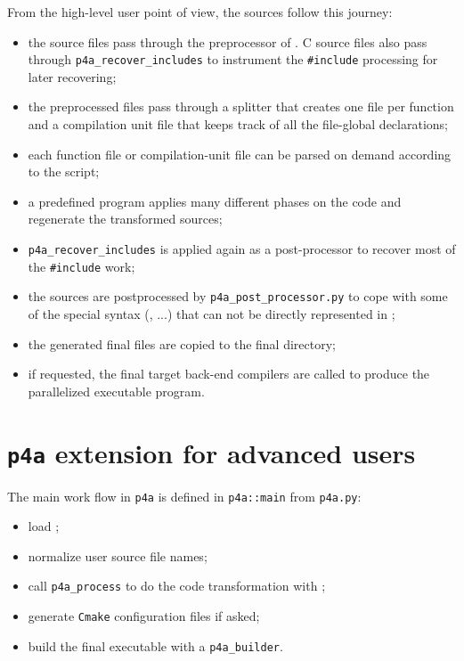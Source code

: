 \documentclass[a4paper]{article}
\begin{document}
From the high-level user point of view, the sources follow this journey:
\begin{itemize}
\item the source files pass through the preprocessor of
  \Apips. C source files also pass through
  \verb|p4a_recover_includes| to instrument the
  \verb|#include| processing for later recovering;
\item the preprocessed files pass through a splitter that creates
  one file per function and a compilation unit file that keeps track
  of all the file-global declarations;
\item each function file or compilation-unit file can be parsed on
  demand according to the \Apyps script;
\item a predefined \Apyps program applies many different \Apips phases on
  the code and regenerate the transformed sources;
\item \verb|p4a_recover_includes| is applied again as a post-processor
  to recover most of the \verb|#include| work;
\item the sources are postprocessed by
  \verb|p4a_post_processor.py| to cope with some of the special syntax
  (\Acuda, \Aopencl...) that can not be directly represented in \Apips;
\item the generated final files are copied to the final directory;
\item if requested, the final target back-end compilers are called to
  produce the parallelized executable program.
\end{itemize}


\section{\protect\texttt{p4a} extension for advanced users}
\label{sec:p4a-extension}

The main work flow in \texttt{p4a} is
defined in \verb|p4a::main| from \verb|p4a.py|:
\begin{itemize}
\item load \Apyps;
\item normalize user source file names;
\item call \verb|p4a_process| to do the code transformation with \Apyps;
\item generate \texttt{Cmake} configuration files if asked;
\item build the final executable with a \verb|p4a_builder|.
\end{itemize}
\end{document}
